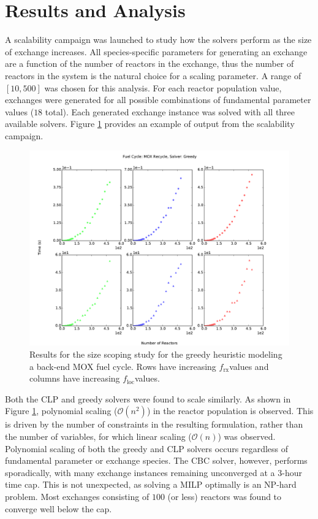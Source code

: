 \documentclass{anstrans}
\newcommand{\frx}{$f_{\text{rx}}$}
\newcommand{\floc}{$f_{\text{loc}}$}
\begin{document}
\section{Results and Analysis}

A scalability campaign was launched to study how the solvers perform as the size
of exchange increases. All species-specific parameters for generating an
exchange are a function of the number of reactors in the exchange, thus the
number of reactors in the system is the natural choice for a scaling
parameter. A range of $[10, 500]$ was chosen for this analysis. For each reactor
population value, exchanges were generated for all possible combinations of
fundamental parameter values ($18$ total). Each generated exchange instance was
solved with all three available solvers. Figure \ref{fig:greedy_size} provides
an example of output from the scalability campaign.

\begin{figure}
  \begin{center}
    \includegraphics[width=1.5\columnwidth]{base_back_n_rxtr_time_fc1_solvergreedy.pdf}
    \caption[]{
      \label{fig:greedy_size}
      Results for the size scoping study for the greedy heuristic modeling a
      back-end MOX fuel cycle. Rows have increasing \frx values and columns have
      increasing \floc values.}
  \end{center}
\end{figure}

Both the CLP and greedy solvers were found to scale similarly. As shown in
Figure \ref{fig:greedy_size}, polynomial scaling ($\mathcal{O}(n^2)$) in the
reactor population is observed. This is driven by the number of constraints in
the resulting formulation, rather than the number of variables, for which linear
scaling ($\mathcal{O}(n)$) was observed. Polynomial scaling of both the greedy
and CLP solvers occurs regardless of fundamental parameter or exchange
species. The CBC solver, however, performs sporadically, with many exchange
instances remaining unconverged at a $3$-hour time cap. This is not unexpected,
as solving a MILP optimally is an NP-hard problem. Most exchanges consisting of
$100$ (or less) reactors was found to converge well below the cap.
\end{document}
